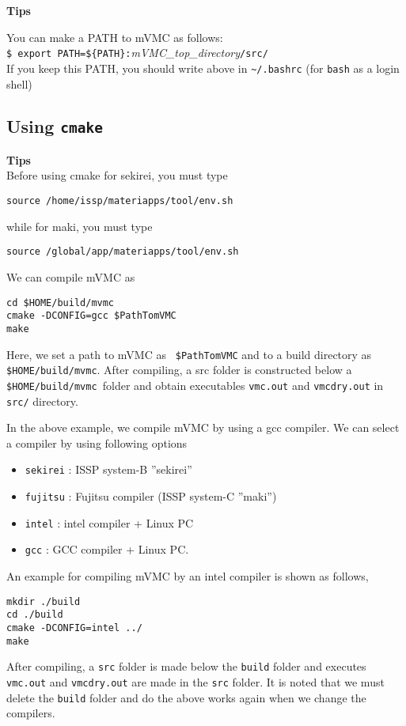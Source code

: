 \begin{screen}
\Large 
{\bf Tips}
\normalsize

You can make a PATH to mVMC as follows:
\\
\verb|$ export PATH=${PATH}:|\textit{mVMC\_top\_directory}\verb|/src/|
\\
If you keep this PATH, you should write above in \verb|~/.bashrc|
(for \verb|bash| as a login shell)

\end{screen}


\subsection{Using \texttt{cmake}}

\begin{screen}
\Large 
{\bf Tips}
\normalsize\\
Before using cmake for sekirei, you must type 
\begin{verbatim}
source /home/issp/materiapps/tool/env.sh
\end{verbatim}
while for maki, you must type
\begin{verbatim}
source /global/app/materiapps/tool/env.sh
\end{verbatim}
\end{screen}

We can compile mVMC as
\begin{verbatim}
cd $HOME/build/mvmc
cmake -DCONFIG=gcc $PathTomVMC
make
\end{verbatim}
Here, we set a path to mVMC as \verb| $PathTomVMC| and to a build directory as \verb| $HOME/build/mvmc|. 
After compiling, a src folder is constructed below a \verb| $HOME/build/mvmc |folder 
and obtain executables \verb|vmc.out| and \verb|vmcdry.out| in \verb|src/| directory. 

In the above example, we compile mVMC by using a gcc compiler. 
We can select a compiler by using following options
\begin{itemize}
\item \verb|sekirei| : ISSP system-B ''sekirei''
\item \verb|fujitsu| : Fujitsu compiler (ISSP system-C ''maki'')
\item \verb|intel| : intel compiler + Linux PC
\item \verb|gcc| : GCC compiler + Linux PC.
\end{itemize}
An example for compiling mVMC by an intel compiler is shown as follows, 
\begin{verbatim}
mkdir ./build
cd ./build
cmake -DCONFIG=intel ../
make
\end{verbatim}
After compiling,  a \verb|src| folder is made below the \verb|build| folder and executes
\verb|vmc.out| and \verb|vmcdry.out| are made in the  \verb|src| folder. 
It is noted that  we must delete the  \verb|build| folder and do the above works again 
when we change the compilers.

